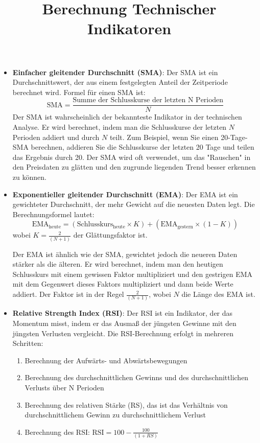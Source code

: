 \documentclass{article}
\title{Berechnung Technischer Indikatoren}
\author{}
\date{}
\begin{document}
\maketitle


\begin{itemize}

\item \textbf{Einfacher gleitender Durchschnitt (SMA)}: Der SMA ist ein Durchschnittswert, der aus einem festgelegten Anteil der Zeitperiode berechnet wird. Formel für einen SMA ist:
\[ \text{SMA} = \frac{\text{Summe der Schlusskurse der letzten N Perioden}}{N} \]
Der SMA ist wahrscheinlich der bekannteste Indikator in der technischen Analyse. Er wird berechnet, indem man die Schlusskurse der letzten $N$ Perioden addiert und durch $N$ teilt. Zum Beispiel, wenn Sie einen 20-Tage-SMA berechnen, addieren Sie die Schlusskurse der letzten 20 Tage und teilen das Ergebnis durch 20. Der SMA wird oft verwendet, um das "Rauschen" in den Preisdaten zu glätten und den zugrunde liegenden Trend besser erkennen zu können.

\item \textbf{Exponentieller gleitender Durchschnitt (EMA)}: Der EMA ist ein gewichteter Durchschnitt, der mehr Gewicht auf die neuesten Daten legt. Die Berechnungsformel lautet:
\[ \text{EMA}_{\text{heute}} = (\text{Schlusskurs}_{\text{heute}} \times K) + (\text{EMA}_{\text{gestern}} \times (1-K)) \]
wobei \( K = \frac{2}{(N+1)} \) der Glättungsfaktor ist.

Der EMA ist ähnlich wie der SMA, gewichtet jedoch die neueren Daten stärker als die älteren. Er wird berechnet, indem man den heutigen Schlusskurs mit einem gewissen Faktor multipliziert und den gestrigen EMA mit dem Gegenwert dieses Faktors multipliziert und dann beide Werte addiert. Der Faktor ist in der Regel $\frac{2}{(N+1)}$, wobei $N$ die Länge des EMA ist.
\newpage
\item \textbf{Relative Strength Index (RSI)}: Der RSI ist ein Indikator, der das Momentum misst, indem er das Ausmaß der jüngsten Gewinne mit den jüngsten Verlusten vergleicht. Die RSI-Berechnung erfolgt in mehreren Schritten:
\begin{enumerate}
    \item Berechnung der Aufwärts- und Abwärtsbewegungen
    \item Berechnung des durchschnittlichen Gewinns und des durchschnittlichen Verlusts über N Perioden
    \item Berechnung des relativen Stärke (RS), das ist das Verhältnis von durchschnittlichem Gewinn zu durchschnittlichem Verlust
    \item Berechnung des RSI: \( \text{RSI} = 100 - \frac{100}{(1 + RS)} \)
\end{enumerate}


\end{itemize}
\end{document}
